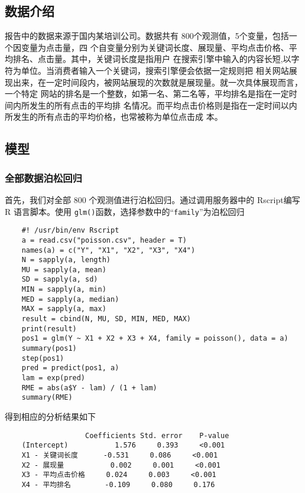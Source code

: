 \subsection{数据介绍}\label{ux6570ux636eux4ecbux7ecd}

报告中的数据来源于国内某培训公司。数据共有 800个观测值，5个变量，包括一个因变量为点击量，四
个自变量分别为关键词长度、展现量、平均点击价格、平均排名、点击量。其中，关键词长度是指用户
在搜索引擎中输入的内容长短,以字符为单位。当消费者输入一个关键词，搜索引擎便会依据一定规则把
相关网站展现出来，在一定时间段内，被网站展现的次数就是展现量。就一次具体展现而言，一个特定
网站的排名是一个整数，如第一名、第二名等，平均排名是指在一定时间内所发生的所有点击的平均排
名情况。而平均点击价格则是指在一定时间以内所发生的所有点击的平均价格，也常被称为单位点击成
本。

\subsection{模型}\label{ux6a21ux578b}

\subsubsection{全部数据泊松回归}\label{ux5168ux90e8ux6570ux636eux6ccaux677eux56deux5f52}

首先，我们对全部 800 个观测值进行泊松回归。通过调用服务器中的 Rscript编写
R 语言脚本。使用 \lstinline!glm()!函数，选择参数中的``\lstinline!family!''为泊松回归

\begin{lstlisting}
	#! /usr/bin/env Rscript
	a = read.csv("poisson.csv", header = T)
	names(a) = c("Y", "X1", "X2", "X3", "X4")
	N = sapply(a, length)
	MU = sapply(a, mean)
	SD = sapply(a, sd)
	MIN = sapply(a, min)
	MED = sapply(a, median)
	MAX = sapply(a, max)
	result = cbind(N, MU, SD, MIN, MED, MAX)
	print(result)
	pos1 = glm(Y ~ X1 + X2 + X3 + X4, family = poisson(), data = a)
	summary(pos1)
	step(pos1)
	pred = predict(pos1, a)
	lam = exp(pred)
	RME = abs(a$Y - lam) / (1 + lam)
	summary(RME)
\end{lstlisting}

得到相应的分析结果如下

\begin{lstlisting}
	               Coefficients Std. error    P-value
	(Intercept)           1.576     0.393     <0.001
	X1 - 关键词长度      -0.531     0.086     <0.001
	X2 - 展现量           0.002     0.001     <0.001
	X3 - 平均点击价格     0.024     0.003     <0.001
	X4 - 平均排名        -0.109     0.080     0.176
\end{lstlisting}

